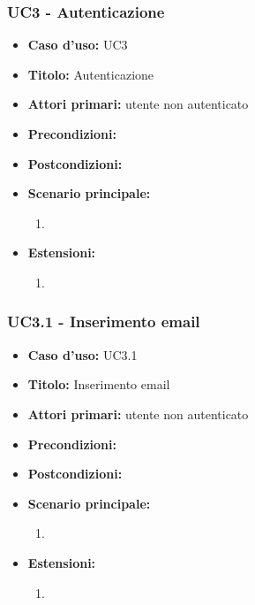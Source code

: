 \documentclass[casi-duso]{subfiles}
\begin{document}
\subsubsection{UC3 - Autenticazione}
\label{subsub:uc2utente}
\begin{itemize}
  \item \textbf{Caso d’uso:} UC3 
  \item \textbf{Titolo:} Autenticazione
  \item \textbf{Attori primari:} utente non autenticato
  \item \textbf{Precondizioni:} 
  \item \textbf{Postcondizioni:}
  \item \textbf{Scenario principale:} 
  \begin{enumerate}
    \item 
  \end{enumerate}  
  \item \textbf{Estensioni:} 
  \begin{enumerate}
    \item 
  \end{enumerate}  
\end{itemize}

\subsubsection{UC3.1 - Inserimento email}
\label{subsub:uc2.1utente}
\begin{itemize}
  \item \textbf{Caso d’uso:} UC3.1 
  \item \textbf{Titolo:} Inserimento email
  \item \textbf{Attori primari:} utente non autenticato
  \item \textbf{Precondizioni:} 
  \item \textbf{Postcondizioni:}
  \item \textbf{Scenario principale:} 
  \begin{enumerate}
    \item 
  \end{enumerate}  
  \item \textbf{Estensioni:} 
  \begin{enumerate}
    \item 
  \end{enumerate}  
\end{itemize}
\end{document}
